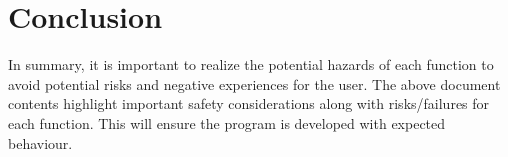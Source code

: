 \documentclass{article}
\begin{document}
\section{Conclusion}
In summary, it is important to realize the potential hazards of each function to avoid potential risks and negative experiences for the user. The above document contents highlight
important safety considerations along with risks/failures for each function. This will ensure
the program is developed with expected behaviour.
\end{document}
